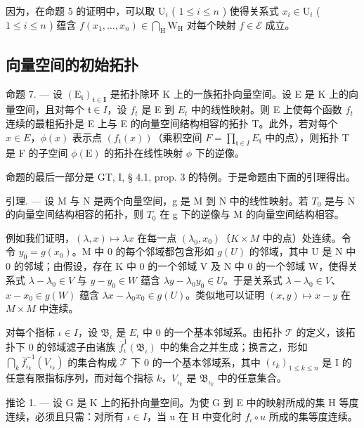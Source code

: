 因为，在命题 5 的证明中，可以取 \(\mathrm{U}_i\) ( \(1 \leqslant i \leqslant n\) ) 使得关系式 \(x_i \in \mathrm{U}_i\) ( \(1 \leqslant i \leqslant n\) ) 蕴含 \(f(x_1, \ldots, x_n) \in \bigcap_{\mathrm{H}} \mathrm{W}_{\mathrm{H}}\) 对每个映射 \(f \in \mathcal{E}\) 成立。

\subsection{向量空间的初始拓扑}

命题 7. --- 设 \((\mathrm{E}_{\mathfrak{t}})_{\mathfrak{t}\in\mathbf{I}}\) 是拓扑除环 K 上的一族拓扑向量空间。设 E 是 K 上的向量空间，且对每个 \(\mathfrak{t}\in I\)，设 \(f_{t}\) 是 E 到 \(E_{t}\) 中的线性映射。则 E 上使每个函数 \(f_{t}\) 连续的最粗拓扑是 E 上与 E 的向量空间结构相容的拓扑 T。此外，若对每个 \(x\in E\)，\(\phi(x)\) 表示点 \((f_{\mathfrak{t}}(x))\)（乘积空间 \(F=\prod_{\mathfrak{t}\in I}E_{\mathfrak{t}}\) 中的点），则拓扑 T 是 F 的子空间 \(\phi(\mathrm{E})\) 的拓扑在线性映射 \(\phi\) 下的逆像。

命题的最后一部分是 GT, I, § 4.1, prop. 3 的特例。于是命题由下面的引理得出。

引理. --- 设 M 与 N 是两个向量空间，g 是 M 到 N 中的线性映射。若 \(T_{0}\) 是与 N 的向量空间结构相容的拓扑，则 \(T_{0}\) 在 g 下的逆像与 M 的向量空间结构相容。

例如我们证明，\((\lambda, x) \mapsto \lambda x\) 在每一点 \((\lambda_{0}, x_{0})\)（\(K \times M\) 中的点）处连续。令令 \(y_{0} = g(x_{0})\)。M 中 0 的每个邻域都包含形如 \(g(U)\) 的邻域，其中 U 是 N 中 0 的邻域；由假设，存在 K 中 0 的一个邻域 V 及 N 中 0 的一个邻域 W，使得关系式 \(\lambda - \lambda_{0} \in V\) 与 \(y - y_{0} \in W\) 蕴含 \(\lambda y - \lambda_{0}y_{0} \in U\)。于是关系式 \(\lambda - \lambda_{0} \in V\)、\(x - x_{0} \in g(W)\) 蕴含 \(\lambda x - \lambda_{0}x_{0} \in g(U)\)。类似地可以证明 \((x, y) \mapsto x - y\) 在 \(M \times M\) 中连续。

对每个指标 \(\iota \in I\)，设 \(\mathfrak{B}_{\iota}\) 是 \(E_{\iota}\) 中 0 的一个基本邻域系。由拓扑 \(\mathcal{T}\) 的定义，该拓扑下 0 的邻域滤子由诸族 \(\overline{f}_{\iota}^{1}(\mathfrak{B}_{\iota})\) 中的集合之并生成；换言之，形如 \(\bigcap_{k} \overline{f}_{\iota_k}^{-1}(V_{\iota_k})\) 的集合构成 \(\mathcal{T}\) 下 0 的一个基本邻域系，其中 \((\iota_k)_{1 \leqslant k \leqslant n}\) 是 I 的任意有限指标序列，而对每个指标 \(k\)，\(V_{\iota_k}\) 是 \(\mathfrak{B}_{\iota_k}\) 中的任意集合。

推论 1. --- 设 G 是 K 上的拓扑向量空间。为使 G 到 E 中的映射所成的集 H 等度连续，必须且只需：对所有 \(\iota \in I\)，当 u 在 H 中变化时 \(f_{\iota} \circ u\) 所成的集等度连续。

